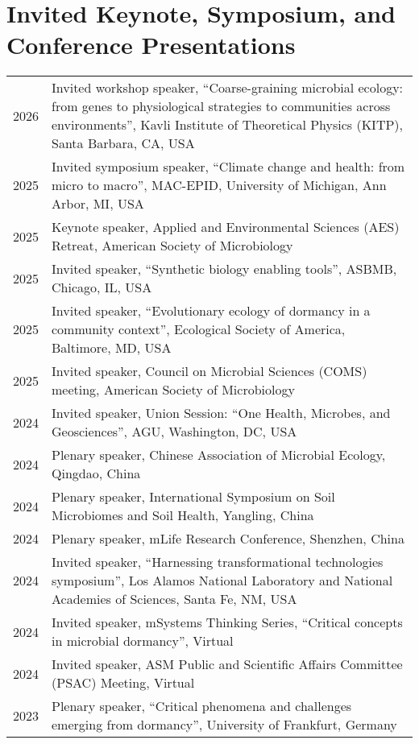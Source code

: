 \documentclass[11pt]{article}
\begin{document}
\section*{Invited Keynote, Symposium, and Conference Presentations}
\vspace{-1.25em} %
\noindent
\begin{longtable}{@{}p{3em}@{\hspace{1.5em}}p{}@{}}

2026 & Invited workshop speaker, “Coarse-graining microbial ecology: from genes to physiological strategies to communities across environments”, Kavli Institute of Theoretical Physics (KITP), Santa Barbara, CA, USA \\
2025 & Invited symposium speaker, “Climate change and health: from micro to macro”, MAC-EPID, University of Michigan, Ann Arbor, MI, USA \\
2025 & Keynote speaker, Applied and Environmental Sciences (AES) Retreat, American Society of Microbiology \\
2025 & Invited speaker, “Synthetic biology enabling tools”, ASBMB, Chicago, IL, USA \\
2025 & Invited speaker, “Evolutionary ecology of dormancy in a community context”, Ecological Society of America, Baltimore, MD, USA \\
2025 & Invited speaker, Council on Microbial Sciences (COMS) meeting, American Society of Microbiology \\
2024 & Invited speaker, Union Session: “One Health, Microbes, and Geosciences”, AGU, Washington, DC, USA \\
2024 & Plenary speaker, Chinese Association of Microbial Ecology, Qingdao, China \\
2024 & Plenary speaker, International Symposium on Soil Microbiomes and Soil Health, Yangling, China \\
2024 & Plenary speaker, mLife Research Conference, Shenzhen, China \\
2024 & Invited speaker, “Harnessing transformational technologies symposium”, Los Alamos National Laboratory and National Academies of Sciences, Santa Fe, NM, USA \\
2024 & Invited speaker, mSystems Thinking Series, “Critical concepts in microbial dormancy”, Virtual \\
2024 & Invited speaker, ASM Public and Scientific Affairs Committee (PSAC) Meeting, Virtual \\
2023 & Plenary speaker, “Critical phenomena and challenges emerging from dormancy”, University of Frankfurt, Germany \\

\end{longtable}
\end{document}

